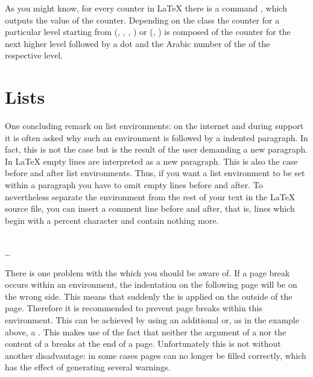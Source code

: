 \begin{Declaration}
\end{Declaration}%
%
As you might know, for every counter in {\LaTeX} there is a command
, which outputs the value of the
counter. Depending on the class the counter for a particular level
starting from  (, ,
, ) or 
(, ) is composed of the counter for the
next higher level followed by a dot and the Arabic number of the
 of the respective level.\par
%
%

\section{Lists}
\label{sec:maincls-experts.lists} 

One concluding remark on list environments: on the internet and during support
it is often asked why such an environment is followed by a
indented paragraph. In fact, this is not the case but is
the result of the user demanding a new paragraph. In {\LaTeX} empty lines are
interpreted as a new paragraph. This is also the case before and after list
environments. Thus, if you want a list environment to be set within a
paragraph you have to omit empty lines before and after. To nevertheless
separate the environment from the rest of your text in the {\LaTeX} source
file, you can insert a comment line before and after, that is, lines which
begin with a percent character and contain nothing more.

\begin{Declaration}
  \\
  \quad\dots\\
\end{Declaration}
%
There is one problem with the  which you
should be aware of. If a page break occurs within an
 environment, the indentation on the following
page will be on the wrong side.  This means that suddenly the
 is applied on the outside of the
page. Therefore it is recommended to prevent page breaks within this
environment. This can be achieved by using an additional
 or, as in the example above, a
. This makes use of the fact that neither the
argument of a  nor the content of a
 breaks at the end of a page.  Unfortunately
this is not without another disadvantage: in some cases pages can no
longer be filled correctly, which has the effect of generating several
warnings.
%

